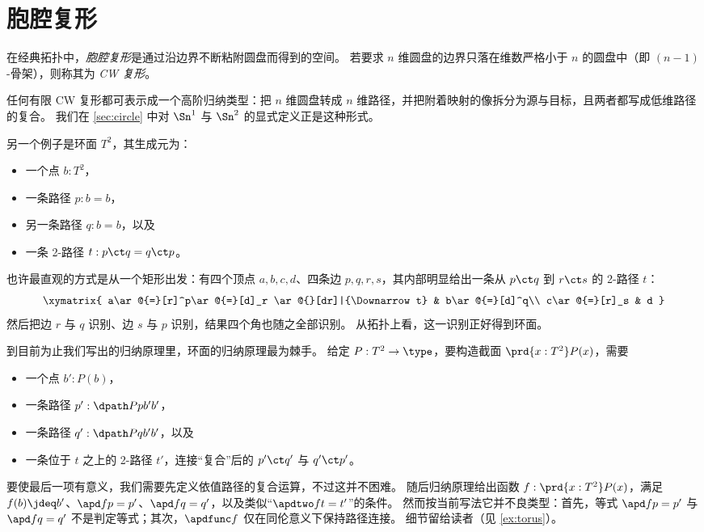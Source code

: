%

\section{胞腔复形}
\label{sec:cell-complexes}

%
%
在经典拓扑中，\emph{胞腔复形}是通过沿边界不断粘附圆盘而得到的空间。
若要求 $n$ 维圆盘的边界只落在维数严格小于 $n$ 的圆盘中（即 $(n-1)$-骨架），则称其为 \emph{CW 复形}。

任何有限 CW 复形都可表示成一个高阶归纳类型：把 $n$ 维圆盘转成 $n$ 维路径，并把附着映射的像拆分为源与目标，且两者都写成低维路径的复合。
我们在 \cref{sec:circle} 中对 $\Sn^1$ 与 $\Sn^2$ 的显式定义正是这种形式。

%
另一个例子是环面 $T^2$，其生成元为：
\begin{itemize}
\item 一个点 $b:T^2$，
\item 一条路径 $p:b=b$，
\item 另一条路径 $q:b=b$，以及
\item 一条 2-路径 $t: p\ct q = q \ct p$。
\end{itemize}
也许最直观的方式是从一个矩形出发：有四个顶点 $a,b,c,d$、四条边 $p,q,r,s$，其内部明显给出一条从 $p\ct q$ 到 $r\ct s$ 的 2-路径 $t$：
\begin{equation*}
  \xymatrix{
      a\ar@{=}[r]^p\ar@{=}[d]_r \ar@{}[dr]|{\Downarrow t} &
      b\ar@{=}[d]^q\\
      c\ar@{=}[r]_s &
      d
      }
\end{equation*}
然后把边 $r$ 与 $q$ 识别、边 $s$ 与 $p$ 识别，结果四个角也随之全部识别。
从拓扑上看，这一识别正好得到环面。

%
%
到目前为止我们写出的归纳原理里，环面的归纳原理最为棘手。
给定 $P:T^2\to\type$，要构造截面 $\prd{x:T^2} P(x)$，需要
\begin{itemize}
\item 一个点 $b':P(b)$，
\item 一条路径 $p' : \dpath P p {b'} {b'}$，
\item 一条路径 $q' : \dpath P q {b'} {b'}$，以及
\item 一条位于 $t$ 之上的 2-路径 $t'$，连接“复合”后的 $p'\ct q'$ 与 $q'\ct p'$。
\end{itemize}
要使最后一项有意义，我们需要先定义依值路径的复合运算，不过这并不困难。
随后归纳原理给出函数 $f:\prd{x:T^2} P(x)$，满足 $f(b)\jdeq b'$、$\apd f {p} = p'$、$\apd f {q} = q'$，以及类似“$\apdtwo f t = t'$”的条件。
然而按当前写法它并不良类型：首先，等式 $\apd f {p} = p'$ 与 $\apd f {q} = q'$ 不是判定等式；其次，$\apdfunc f$ 仅在同伦意义下保持路径连接。
细节留给读者（见 \cref{ex:torus}）。


